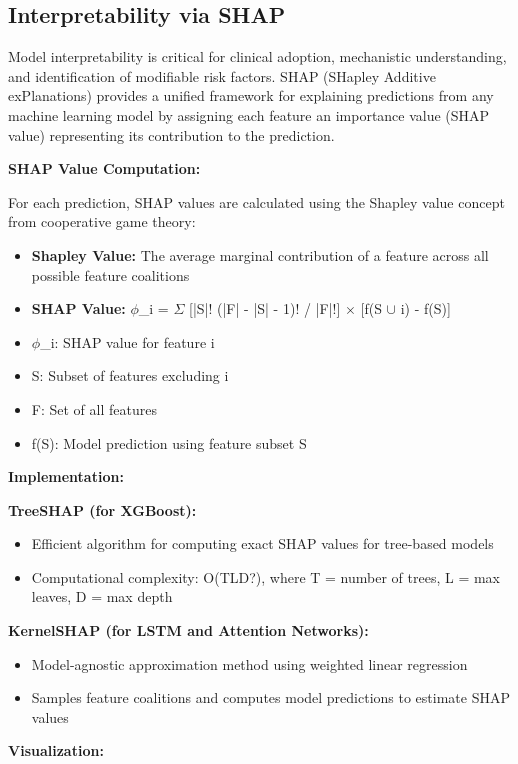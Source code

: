 \documentclass[journal,twoside,10pt]{IEEEtran}
\begin{document}
\subsection{Interpretability via SHAP}

Model interpretability is critical for clinical adoption, mechanistic understanding, and identification of modifiable risk factors. SHAP (SHapley Additive exPlanations) provides a unified framework for explaining predictions from any machine learning model by assigning each feature an importance value (SHAP value) representing its contribution to the prediction.

\textbf{SHAP Value Computation:}

For each prediction, SHAP values are calculated using the Shapley value concept from cooperative game theory:
\begin{itemize}
\item \textbf{Shapley Value:} The average marginal contribution of a feature across all possible feature coalitions
\item \textbf{SHAP Value:} $\phi$\_i = $\Sigma$ [|S|! (|F| - |S| - 1)! / |F|!] $\times$ [f(S $\cup$ {i}) - f(S)]
\item $\phi$\_i: SHAP value for feature i
\item S: Subset of features excluding i
\item F: Set of all features
\item f(S): Model prediction using feature subset S
\end{itemize}

\textbf{Implementation:}

\textbf{TreeSHAP (for XGBoost):}
\begin{itemize}
\item Efficient algorithm for computing exact SHAP values for tree-based models
\item Computational complexity: O(TLD?), where T = number of trees, L = max leaves, D = max depth
\end{itemize}

\textbf{KernelSHAP (for LSTM and Attention Networks):}
\begin{itemize}
\item Model-agnostic approximation method using weighted linear regression
\item Samples feature coalitions and computes model predictions to estimate SHAP values
\end{itemize}

\textbf{Visualization:}
\end{document}
